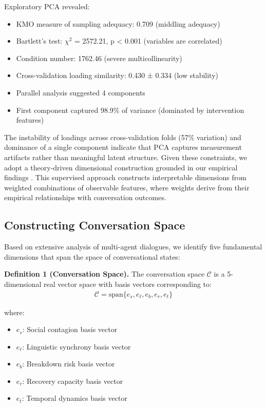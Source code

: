 \documentclass[11pt,letterpaper]{article}
\newcommand{\kmoValue}{0.709}
\newcommand{\bartlettChiSquare}{2572.21}
\newcommand{\conditionNumber}{1762.46}
\newcommand{\avgLoadingSimilarity}{0.430}
\newcommand{\loadingSimilarityStd}{0.334}
\newcommand{\parallelAnalysisComponents}{4}
\newcommand{\pcaFirstComponentVariance}{98.9\%}
\newcommand{\pcaInstability}{57\%} %
\begin{document}
Exploratory PCA revealed:
\begin{itemize}
    \item KMO measure of sampling adequacy: \kmoValue{} (middling adequacy)
    \item Bartlett's test: $\chi^2$ = \bartlettChiSquare{}, p < 0.001 (variables are correlated)
    \item Condition number: \conditionNumber{} (severe multicollinearity)
    \item Cross-validation loading similarity: \avgLoadingSimilarity{} ± \loadingSimilarityStd{} (low stability)
    \item Parallel analysis suggested \parallelAnalysisComponents{} components
    \item First component captured \pcaFirstComponentVariance{} of variance (dominated by intervention features)
\end{itemize}

The instability of loadings across cross-validation folds (\pcaInstability{} variation) and dominance of a single component indicate that PCA captures measurement artifacts rather than meaningful latent structure. Given these constraints, we adopt a theory-driven dimensional construction grounded in our empirical findings \citep{garcia2025peer}. This supervised approach constructs interpretable dimensions from weighted combinations of observable features, where weights derive from their empirical relationships with conversation outcomes.

\subsection{Constructing Conversation Space}

Based on extensive analysis of multi-agent dialogues, we identify five fundamental dimensions that span the space of conversational states:

\textbf{Definition 1 (Conversation Space).} The conversation space $\mathcal{C}$ is a 5-dimensional real vector space with basis vectors corresponding to:
\begin{align}
\mathcal{C} = \text{span}\{e_s, e_\ell, e_b, e_r, e_t\}
\end{align}

where:
\begin{itemize}
    \item $e_s$: Social contagion basis vector
    \item $e_\ell$: Linguistic synchrony basis vector
    \item $e_b$: Breakdown risk basis vector
    \item $e_r$: Recovery capacity basis vector
    \item $e_t$: Temporal dynamics basis vector
\end{itemize}
\end{document}
